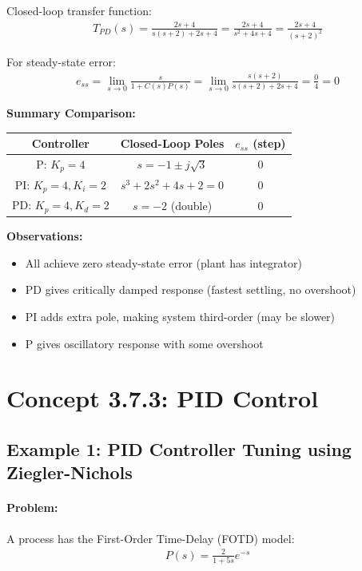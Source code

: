 \documentclass[11pt,a4paper]{article}
\begin{document}
Closed-loop transfer function:
\begin{align}
T_{PD}(s) = \frac{2s+4}{s(s+2) + 2s + 4} = \frac{2s+4}{s^2 + 4s + 4} = \frac{2s+4}{(s+2)^2}
\end{align}

For steady-state error:
\begin{align}
e_{ss} = \lim_{s \to 0} \frac{s}{1 + C(s)P(s)} = \lim_{s \to 0} \frac{s(s+2)}{s(s+2) + 2s + 4} = \frac{0}{4} = 0
\end{align}

\textbf{Summary Comparison:}

\begin{center}
\begin{tabular}{|c|c|c|}
\hline
Controller & Closed-Loop Poles & $e_{ss}$ (step) \\
\hline
P: $K_p = 4$ & $s = -1 \pm j\sqrt{3}$ & 0 \\
PI: $K_p = 4, K_i = 2$ & $s^3 + 2s^2 + 4s + 2 = 0$ & 0 \\
PD: $K_p = 4, K_d = 2$ & $s = -2$ (double) & 0 \\
\hline
\end{tabular}
\end{center}

\textbf{Observations:}
\begin{itemize}
\item All achieve zero steady-state error (plant has integrator)
\item PD gives critically damped response (fastest settling, no overshoot)
\item PI adds extra pole, making system third-order (may be slower)
\item P gives oscillatory response with some overshoot
\end{itemize}

\section{Concept 3.7.3: PID Control}

\subsection{Example 1: PID Controller Tuning using Ziegler-Nichols}

\paragraph{Problem:} A process has the First-Order Time-Delay (FOTD) model:
\begin{align}
P(s) = \frac{2}{1+5s}e^{-s}
\end{align}
\end{document}
